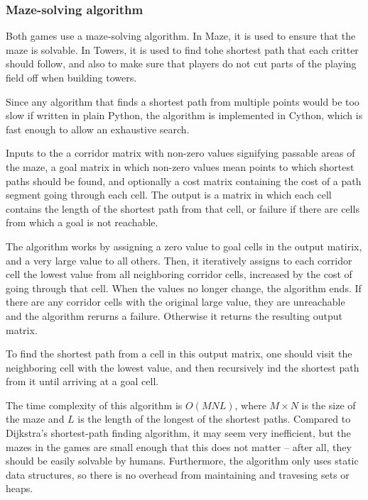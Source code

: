 \documentclass[a4paper,12pt]{article}
\begin{document}
\subsubsection{Maze-solving algorithm}

Both games use a maze-solving algorithm.
In Maze, it is used to ensure that the maze is solvable.
In Towers, it is used to find tohe shortest path that each critter should
follow, and also to make sure that players do not cut parts of the playing
field off when building towers.

Since any algorithm that finds a shortest path from multiple points would
be too slow if written in plain Python, the algorithm is implemented in Cython,
which is fast enough to allow an exhaustive search.

Inputs to the a corridor matrix with non-zero values signifying passable areas
of the maze, a goal matrix in which non-zero values mean points to which
shortest paths should be found, and optionally a cost matrix containing
the cost of a path segment going through each cell.
The output is a matrix in which each cell contains the length of the shortest
path from that cell, or failure if there are cells from which a goal is not
reachable.

The algorithm works by assigning a zero value to goal cells in the output
matirix, and a very large value to all others.
Then, it iteratively assigns to each corridor cell the lowest value from all
neighboring corridor cells, increased by the cost of going through that cell.
When the values no longer change, the algorithm ends.
If there are any corridor cells with the original large value, they are
unreachable and the algorithm rerurns a failure.
Otherwise it returns the resulting output matrix.

To find the shortest path from a cell in this output matrix, one should visit
the neighboring cell with the lowest value, and then recursively ind the
shortest path from it until arriving at a goal cell.


The time complexity of this algorithm is $O(MNL)$, where $M \times N$ is the
size of the maze and $L$ is the length of the longest of the shortest paths.
Compared to Dijkstra's shortest-path finding algorithm, it may seem very
inefficient, but the mazes in the games are small enough that this does not
matter – after all, they should be easily solvable by humans.
Furthermore, the algorithm only uses static data structures, so there is
no overhead from maintaining and travesing sets or heaps.
\end{document}
